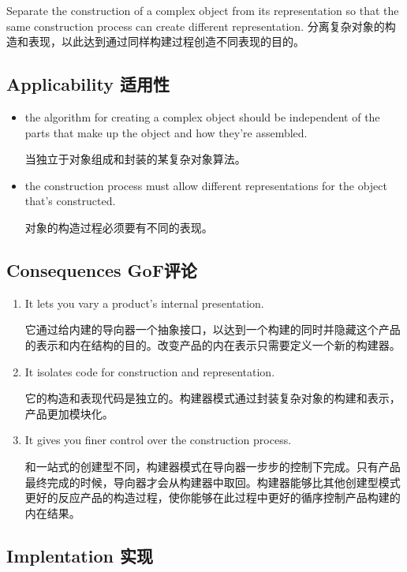 Separate the construction of a complex object from its representation so that the same construction process can create different representation.
分离复杂对象的构造和表现，以此达到通过同样构建过程创造不同表现的目的。

\subsection{Applicability 适用性}

\begin{itemize}
\item the algorithm for creating a complex object should be independent of the parts that make up the object and how they're assembled.

      当独立于对象组成和封装的某复杂对象算法。

\item the construction process must allow different representations for the object that's constructed.

      对象的构造过程必须要有不同的表现。
\end{itemize}

\subsection{Consequences GoF评论}

\begin{enumerate}

\item It lets you vary a product's internal presentation.

	  它通过给内建的导向器一个抽象接口，以达到一个构建的同时并隐藏这个产品的表示和内在结构的目的。改变产品的内在表示只需要定义一个新的构建器。

\item It isolates code for construction and representation. 

	 它的构造和表现代码是独立的。构建器模式通过封装复杂对象的构建和表示，产品更加模块化。

\item It gives you finer control over the construction process.

	  和一站式的创建型不同，构建器模式在导向器一步步的控制下完成。只有产品最终完成的时候，导向器才会从构建器中取回。构建器能够比其他创建型模式更好的反应产品的构造过程，使你能够在此过程中更好的循序控制产品构建的内在结果。

\end{enumerate}

\subsection{Implentation 实现}

